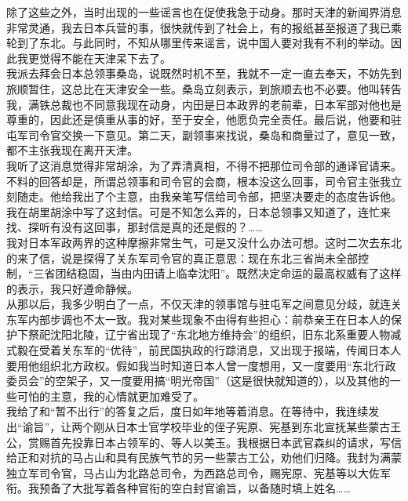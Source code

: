 除了这些之外，当时出现的一些谣言也在促使我急于动身。那时天津的新闻界消息非常灵通，我去日本兵营的事，很快就传到了社会上，有的报纸甚至报道了我已乘轮到了东北。与此同时，不知从哪里传来谣言，说中国人要对我有不利的举动。因此我更觉得不能在天津呆下去了。\\

我派去拜会日本总领事桑岛，说既然时机不至，我就不一定一直去奉天，不妨先到旅顺暂住，这总比在天津安全一些。桑岛立刻表示，到旅顺去也不必要。他叫转告我，满铁总裁也不同意我现在动身，内田是日本政界的老前辈，日本军部对他也是尊重的，因此还是慎重从事的好，至于安全，他愿负完全责任。最后说，他要和驻屯军司令官交换一下意见。第二天，副领事来找说，桑岛和商量过了，意见一致，都不主张我现在离开天津。\\

我听了这消息觉得非常胡涂，为了弄清真相，不得不把那位司令部的通译官请来。不料的回答却是，所谓总领事和司令官的会商，根本没这么回事，司令官主张我立刻随走。他给我出了个主意，由我亲笔写信给司令部，把坚决要走的态度告诉他。我在胡里胡涂中写了这封信。可是不知怎么弄的，日本总领事又知道了，连忙来找、探听有没有这回事，那封信是真的还是假的？……\\

我对日本军政两界的这种摩擦非常生气，可是又没什么办法可想。这时二次去东北的来了信，说是探得了关东军司令官的真正意思：现在东北三省尚未全部控制，“三省团结稳固，当由内田请上临幸沈阳”。既然决定命运的最高权威有了这样的表示，我只好遵命静候。\\

从那以后，我多少明白了一点，不仅天津的领事馆与驻屯军之间意见分歧，就连关东军内部步调也不太一致。我对某些现象不由得有些担心：前恭亲王在日本人的保护下祭祀沈阳北陵，辽宁省出现了“东北地方维持会”的组织，旧东北系重要人物减式毅在受着关东军的“优待”，前民国执政的行踪消息，又出现于报端，传闻日本人要用他组织北方政权。假如我当时知道日本人曾一度想用，又一度要用“东北行政委员会”的空架子，又一度要用搞“明光帝国”（这是很快就知道的），以及其他的一些可怕的主意，我的心情就更加难受了。\\

我给了和“暂不出行”的答复之后，度日如年地等着消息。在等待中，我连续发出“谕旨”，让两个刚从日本士官学校毕业的侄子宪原、宪基到东北宣抚某些蒙古王公，赏赐首先投靠日本占领军的、等人以美玉。我根据日本武官森纠的请求，写信给正和对抗的马占山和具有民族气节的另一些蒙古工公，劝他们归降。我封为满蒙独立军司令官，马占山为北路总司令，为西路总司令，赐宪原、宪基等以大佐军衔。我预备了大批写着各种官衔的空白封官谕旨，以备随时填上姓名……\\

